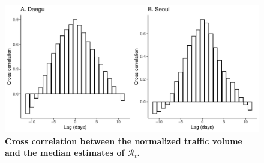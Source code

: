 \pagebreak

\begin{figure}[!ht]
\includegraphics[width=\textwidth]{figure_cross.pdf}
\caption{
\textbf{Cross correlation between the normalized traffic volume and the median estimates of $\mathcal R_t$.}
}
\end{figure}
